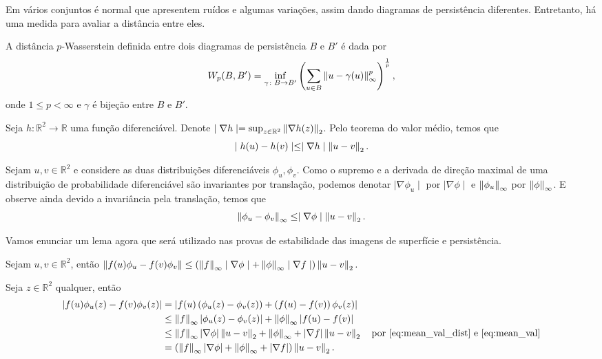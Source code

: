 Em vários conjuntos é normal que apresentem ruídos e algumas variações, assim dando diagramas de persistência
diferentes. Entretanto, há uma medida para avaliar a distância entre eles. 
\begin{defi}
    A distância $p$-Wasserstein definida entre dois diagramas de persistência $B$ e $B'$ é dada por 
    \begin{equation*}
        W_p(B,B') = \inf_{\gamma\colon B \to B'} \left( \sum_{u\in B} \left\lVert u - \gamma(u)\right\rVert_{\infty}^{p} 
                    \right)^\frac{1}{p},
    \end{equation*}
    onde $1 \leq p < \infty$ e $\gamma$ é bijeção entre $B$ e $B'$. 
\end{defi}

Seja $h\colon \mathbb{R}^2 \to \mathbb{R}$ uma função diferenciável. Denote 
$\mid \nabla h \mid = \sup_{z\in \mathbb{R}^2} \left\lVert\nabla h(z)\right\rVert_2$. Pelo teorema do valor médio, temos que 
\begin{equation}\label{eq:mean_val}
    \mid h(u) - h(v) \mid \leq \mid \nabla h \mid \left\lVert u-v\right\rVert_2.
\end{equation}

Sejam $u,v\in \mathbb{R}^2$ e considere as duas distribuições diferenciáveis $\phi_u, \phi_v$. Como o supremo e 
a derivada de direção maximal de uma distribuição de probabilidade diferenciável são invariantes por translação,
podemos denotar $\mid \nabla \phi_u \mid$ por $\mid \nabla \phi \mid$ e $\left\lVert\phi_u\right\rVert_\infty$ por
$\left\lVert\phi\right\rVert_\infty$. E observe ainda devido a invariância pela translação, temos que 
\begin{equation}\label{eq:mean_val_dist}
    \left\lVert\phi_u - \phi_v\right\rVert_\infty \leq \mid \nabla \phi \mid \left\lVert u-v\right\rVert_2.
\end{equation} 

Vamos enunciar um lema agora que será utilizado nas provas de estabilidade das imagens de superfície e persistência.

\begin{lem}\label{lema:persimg}
    Sejam $u,v\in \mathbb{R}^2$, então $\left\lVert f(u)\phi_u - f(v)\phi_v\right\rVert \leq 
    \left( \left\lVert f\right\rVert_\infty \mid \nabla \phi \mid + \left\lVert\phi\right\rVert_\infty \mid \nabla f \mid \right) \left\lVert u-v\right\rVert_2.$
\end{lem}
\begin{demonstracao}
Seja $z\in \mathbb{R}^2$ qualquer, então
\begin{align*}
  \begin{split}
    \left\lvert f(u)\phi_u(z) - f(v)\phi_v(z)\right\rvert &= \left\lvert f(u) \left(\phi_u(z) - \phi_v(z)\right) + \left( f(u) - f(v)\right)
    \phi_v(z)\right\rvert \\
    &\leq \left\lVert f\right\rVert_\infty \left\lvert\phi_u(z) - \phi_v(z)\right\rvert + \left\lVert\phi\right\rVert_\infty \left\lvert f(u) - f(v)\right\rvert\\
    &\leq \left\lVert f\right\rVert_\infty \left\lvert\nabla \phi\right\rvert \left\lVert u-v\right\rVert_2 + \left\lVert\phi\right\rVert_\infty + \left\lvert\nabla f\right\rvert \left\lVert u-v\right\rVert_2 
     \quad \text{por \ref{eq:mean_val_dist} e \ref{eq:mean_val}}\\
    &= \left( \left\lVert f\right\rVert_\infty \left\lvert\nabla \phi\right\rvert + \left\lVert\phi\right\rVert_\infty + \left\lvert\nabla f\right\rvert\right) \left\lVert u-v\right\rVert_2.
  \end{split}
\end{align*}
\end{demonstracao}

